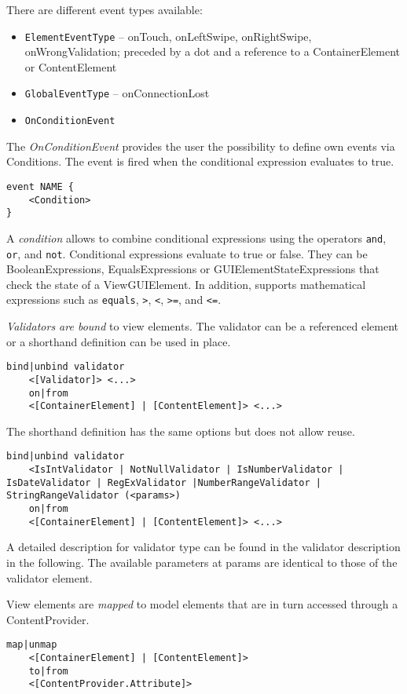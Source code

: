 There are different event types available:
\begin{itemize}
\item \lstinline!ElementEventType! -- onTouch, onLeftSwipe, onRightSwipe, onWrongValidation; preceded by a dot and a reference to a ContainerElement or ContentElement
\item \lstinline!GlobalEventType! -- onConnectionLost
\item \lstinline!OnConditionEvent!
\end{itemize}


The \textit{OnConditionEvent} provides the user the possibility to define own events via Conditions. The event is fired when the conditional expression evaluates to true.
\begin{lstlisting}
event NAME {
	<Condition>
}
\end{lstlisting}

A \textit{condition} allows to combine conditional expressions using the operators \lstinline!and!, \lstinline!or!, and \lstinline!not!. Conditional expressions evaluate to true or false. They can be BooleanExpressions, EqualsExpressions or GUIElementStateExpressions that check the state of a ViewGUIElement. In addition, \MD supports mathematical expressions such as \lstinline!equals!, \lstinline!>!, \lstinline!<!, \lstinline!>=!, and \lstinline!<=!.

\textit{Validators are bound} to view elements. The validator can be a referenced element or a shorthand definition can be used in place.
\begin{lstlisting}
bind|unbind validator
	<[Validator]> <...>
	on|from
	<[ContainerElement] | [ContentElement]> <...>
\end{lstlisting}

The shorthand definition has the same options but does not allow reuse.
\begin{lstlisting}
bind|unbind validator
	<IsIntValidator | NotNullValidator | IsNumberValidator | IsDateValidator | RegExValidator |NumberRangeValidator | StringRangeValidator (<params>)
	on|from
	<[ContainerElement] | [ContentElement]> <...>
\end{lstlisting}

A detailed description for validator type can be found in the validator description in the following. The available parameters at params are identical to those of the validator element.

View elements are \textit{mapped} to model elements that are in turn accessed through a ContentProvider.
\begin{lstlisting}
map|unmap
	<[ContainerElement] | [ContentElement]>
	to|from
	<[ContentProvider.Attribute]>

\end{lstlisting}

